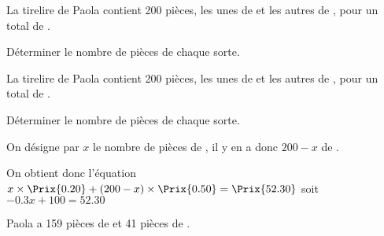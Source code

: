 \begin{exercice*}
    La tirelire de Paola contient 200 pièces, les unes de  et les autres de , pour un total de .

    Déterminer le nombre de pièces de chaque sorte.
\end{exercice*}
\begin{corrige}
    La tirelire de Paola contient 200 pièces, les unes de  et les autres de , pour un total de .

    Déterminer le nombre de pièces de chaque sorte.

    {\color{red} On désigne par $x$ le nombre de pièces de , il y en a donc $200-x$ de .
    
    
    On obtient donc l'équation $x\times\Prix{0.20} + (200-x)\times\Prix{0.50}=\Prix{52.30}$ soit $\num{-0.3}x+100=\num{52.30}$
    

    Paola a 159 pièces de  et 41 pièces de .
}
\end{corrige}

